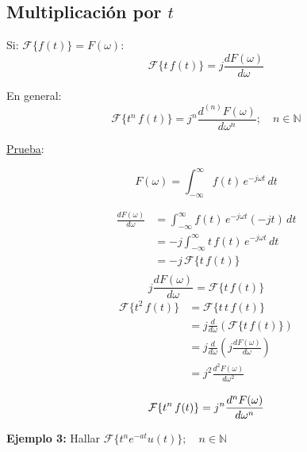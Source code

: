 \subsection{Multiplicación por $t$}
Si: $\mathcal{F}\{f(t)\}=F(\omega)$:
\begin{equation*}
    \mathcal{F}\{t\,f(t)\}=j\frac{dF(\omega)}{d\omega}
\end{equation*}

En general:
\begin{equation}
    \mathcal{F}\{t^n\,f(t)\}=j^n\frac{d^{(n)}F(\omega)}{d\omega^n};
    \quad n\in\mathbb{N}
\end{equation}

\underline{Prueba}:

\begin{equation*}
    F(\omega)=\int_{-\infty}^\infty f(t)\,e^{-j\omega t}\,dt
\end{equation*}

\begin{equation*}
\begin{split}
    \frac{dF(\omega)}{d\omega}
        &=\int_{-\infty}^\infty f(t)\,e^{-j\omega t}(-jt)\,dt\\
        &=-j\int_{-\infty}^\infty t\,f(t)\,e^{-j\omega t}\,dt\\
        &=-j\,\mathcal{F}\{t\,f(t)\}\\
\end{split}
\end{equation*}
\begin{equation*}
    j\frac{dF(\omega)}{d\omega}=\mathcal{F}\{t\,f(t)\}
\end{equation*}
\begin{equation*}
\begin{split}
    \mathcal{F}\{t^2\,f(t)\}
        &=\mathcal{F}\{t\,t\,f(t)\}\\
        &=j\frac{d}{d\omega}\left(\mathcal{F}\{t\,f(t)\}\right)\\
        &=j\frac{d}{d\omega}\left(j\frac{dF(\omega)}{d\omega}\right)\\
        &=j^2\frac{d^2F(\omega)}{d\omega^2}\\
\end{split}
\end{equation*}
\begin{equation*}
    \mathcal{F}\{t^n\,f(t)\}=j^n\frac{d^n F(\omega)}{d\omega^n}\\
\end{equation*}

\textbf{Ejemplo 3:} Hallar $\mathcal{F}\{t^n e^{-at} u(t)\};
\quad n\in\mathbb{N}$

